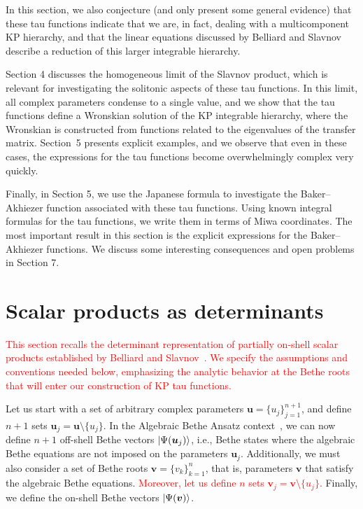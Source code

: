 \documentclass[a4paper,11pt]{amsart}
\begin{document}
In this section, we also conjecture (and only present some general
evidence) that these tau functions indicate that we are, in fact,
dealing with a multicomponent KP hierarchy, and that the linear
equations discussed by Belliard and Slavnov~\cite{Belliard:2019bfz}
describe a reduction of this larger integrable hierarchy.

Section 4 discusses the homogeneous limit of the Slavnov product,
which is relevant for investigating the solitonic aspects of these tau
functions. In this limit, all complex parameters condense to a single
value, and we show that the tau functions define a Wronskian solution
of the KP integrable hierarchy, where the Wronskian is constructed
from functions related to the eigenvalues of the transfer
matrix. Section~5 presents explicit examples, and we observe that even
in these cases, the expressions for the tau functions become
overwhelmingly complex very quickly.

Finally, in Section 5, we use the Japanese formula to investigate the
Baker–Akhiezer function associated with these tau functions. Using
known integral formulas for the tau functions, we write them in terms
of Miwa coordinates. The most important result in this section is the
explicit expressions for the Baker–Akhiezer functions. We discuss some
interesting consequences and open problems in Section 7.

\section{Scalar products as determinants}

\textcolor{red}{This section recalls the determinant representation of partially on-shell scalar
products established by Belliard and Slavnov~\cite{Belliard:2019bfz}. We specify the assumptions and
conventions needed below, emphasizing the analytic behavior at the Bethe roots that will enter our
construction of KP tau functions.}

Let us start with a set of arbitrary complex parameters \(\bm{u} = \{u_j\}_{j=1}^{n+1}\), and define
\(n+1\) sets \(\bm{u}_j=\bm{u}\setminus \{u_j\}\). In the Algebraic Bethe Ansatz
context~\cite{Korepin:1993kvr, Slavnov:2019aba}, we can now define \(n+1\) off-shell Bethe vectors
\(\lvert\Psi(\bm{u}_j)\rangle\), i.e., Bethe states where the algebraic Bethe equations are not imposed on
the parameters \(\bm{u}_j\). Additionally, we must also consider a set of Bethe roots \(\bm{v} = \{
v_k \}_{k=1}^n\), that is, parameters \(\bm{v}\) that satisfy the algebraic Bethe
equations. \textcolor{red}{Moreover, let us define \(n\) sets \(\bm{v}_j = \bm{v}\setminus
\{u_j\}\).} Finally, we define the on-shell Bethe vectors \(\lvert\Psi(\bm{v})\rangle\).
\end{document}
